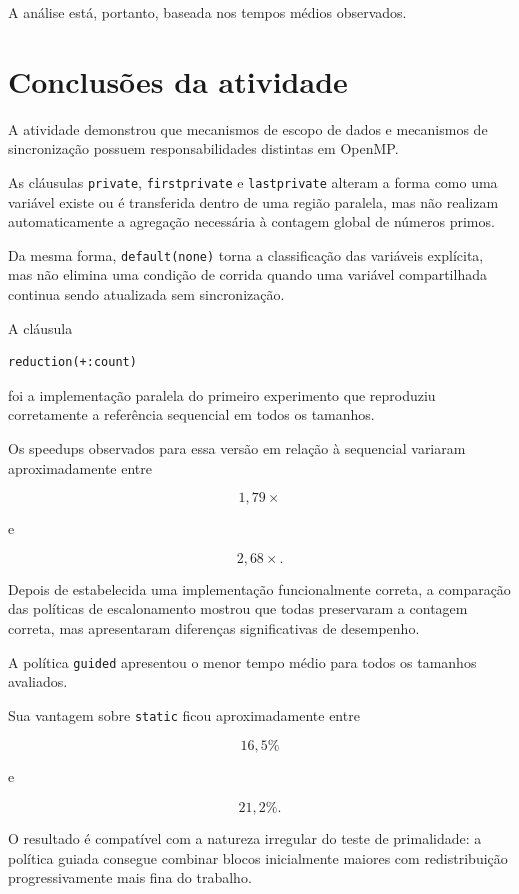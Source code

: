 A análise está, portanto, baseada nos tempos médios observados.


\section{Conclusões da atividade}
\label{sec:atvd07-conclusao}

A atividade demonstrou que mecanismos de escopo de dados e mecanismos de
sincronização possuem responsabilidades distintas em OpenMP.

As cláusulas \texttt{private}, \texttt{firstprivate} e
\texttt{lastprivate} alteram a forma como uma variável existe ou é
transferida dentro de uma região paralela, mas não realizam automaticamente
a agregação necessária à contagem global de números primos.

Da mesma forma, \texttt{default(none)} torna a classificação das variáveis
explícita, mas não elimina uma condição de corrida quando uma variável
compartilhada continua sendo atualizada sem sincronização.

A cláusula

\begin{verbatim}
reduction(+:count)
\end{verbatim}

foi a implementação paralela do primeiro experimento que reproduziu
corretamente a referência sequencial em todos os tamanhos.

Os speedups observados para essa versão em relação à sequencial variaram
aproximadamente entre

\[
1,79\times
\]

e

\[
2,68\times.
\]

Depois de estabelecida uma implementação funcionalmente correta, a
comparação das políticas de escalonamento mostrou que todas preservaram a
contagem correta, mas apresentaram diferenças significativas de desempenho.

A política \texttt{guided} apresentou o menor tempo médio para todos os
tamanhos avaliados.

Sua vantagem sobre \texttt{static} ficou aproximadamente entre

\[
16,5\%
\]

e

\[
21,2\%.
\]

O resultado é compatível com a natureza irregular do teste de primalidade:
a política guiada consegue combinar blocos inicialmente maiores com
redistribuição progressivamente mais fina do trabalho.

